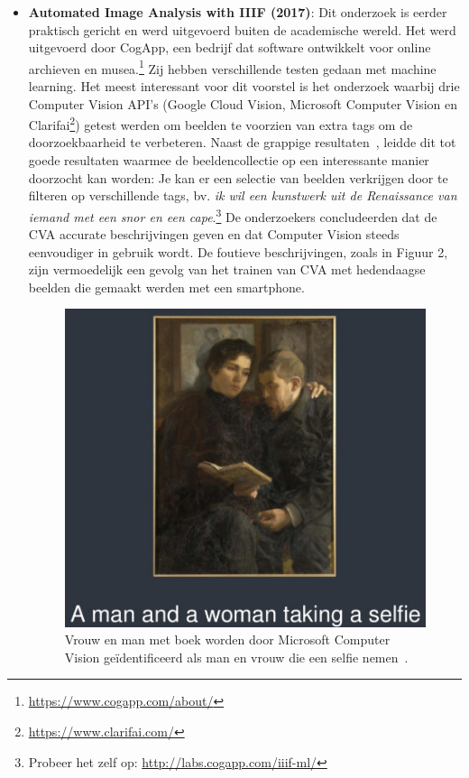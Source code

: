 \begin{itemize}
	\item \textbf{Automated Image Analysis with IIIF (2017)}: Dit onderzoek is eerder praktisch gericht en werd uitgevoerd buiten de academische wereld. Het werd uitgevoerd door CogApp, een bedrijf dat software ontwikkelt voor online archieven en musea.\footnote{\url{https://www.cogapp.com/about/}} Zij hebben verschillende testen gedaan met machine learning. Het meest interessant voor dit voorstel is het onderzoek waarbij drie Computer Vision API's (Google Cloud Vision, Microsoft Computer Vision en Clarifai\footnote{\url{https://www.clarifai.com/}}) getest werden om beelden te voorzien van extra tags om de doorzoekbaarheid te verbeteren. Naast de grappige resultaten~\autocite{Roddis2018}, leidde dit tot goede resultaten waarmee de beeldencollectie op een interessante manier doorzocht kan worden: Je kan er een selectie van beelden verkrijgen door te filteren op verschillende tags, bv. \emph{ik wil een kunstwerk uit de Renaissance van iemand met een snor en een cape}.\footnote{Probeer het zelf op: \url{http://labs.cogapp.com/iiif-ml/}} De onderzoekers concludeerden dat de CVA accurate beschrijvingen geven en dat Computer Vision steeds eenvoudiger in gebruik wordt. De foutieve beschrijvingen, zoals in Figuur 2, zijn vermoedelijk een gevolg van het trainen van CVA met hedendaagse beelden die gemaakt werden met een smartphone.~\autocite{Hindle2017}

	\begin{figure}[h]
		\caption{Vrouw en man met boek worden door Microsoft Computer Vision ge\"{i}dentificeerd als man en vrouw die een selfie nemen~\autocite{Roddis2018}.}
		\centering
		\includegraphics[width=\linewidth]{../voorstel/pictures/roddis_grappig_2}
	\end{figure}

\end{itemize}

